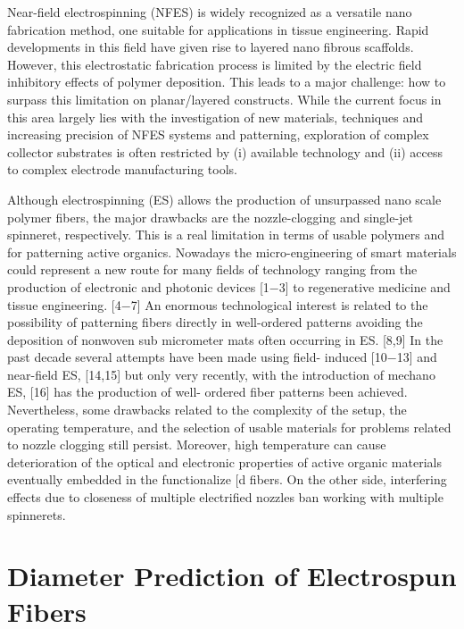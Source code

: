 Near-field electrospinning (NFES) is widely recognized as a versatile nano fabrication method, one suitable for applications in tissue engineering. Rapid developments in this field have given rise to layered nano fibrous scaffolds. However, this electrostatic fabrication process is limited by the electric field inhibitory effects of polymer deposition. This leads to a major challenge: how to surpass this limitation on planar/layered constructs. While the current focus in this area largely lies with the investigation of new materials, techniques and increasing precision of NFES systems and patterning, exploration of complex collector substrates is often restricted by (i) available technology and (ii) access to complex electrode manufacturing tools.

Although electrospinning (ES) allows the production of unsurpassed nano scale polymer fibers, the major drawbacks are the nozzle-clogging and single-jet spinneret, respectively. This is a real limitation in terms of usable polymers and for patterning active organics. Nowadays the micro-engineering of smart materials could represent a new route for many fields of technology ranging from the production of electronic and photonic devices [1\ensuremath{-}3] to regenerative medicine and tissue engineering. [4\ensuremath{-}7] An enormous technological interest is related to the possibility of patterning fibers directly in well-ordered patterns avoiding the deposition of nonwoven sub micrometer mats often occurring in ES. [8,9] In the past decade several attempts have been made using field- induced [10\ensuremath{-}13] and near-field ES, [14,15] but only very recently, with the introduction of mechano ES, [16] has the production of well- ordered fiber patterns been achieved. Nevertheless, some drawbacks related to the complexity of the setup, the operating temperature, and the selection of usable materials for problems related to nozzle clogging still persist. Moreover, high temperature can cause deterioration of the optical and electronic properties of active organic materials eventually embedded in the functionalize [d fibers. On the other side, interfering effects due to closeness of multiple electrified nozzles ban working with multiple spinnerets.

\section{Diameter Prediction of Electrospun Fibers} %

